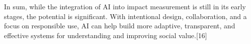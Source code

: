In sum, while the integration of AI into impact measurement is still in its early stages, the potential is significant.
With intentional design, collaboration, and a focus on responsible use, AI can help build more adaptive, transparent, and effective systems for understanding and improving social value.[16]